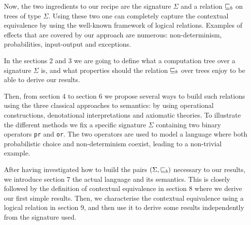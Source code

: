 Now, the two ingredients to our recipe are 
the signature $\Sigma$ and a relation $\sqsubseteq_b$ 
on trees of type $\Sigma$. Using these two one
can completely capture the contextual equivalence 
by using the well-known framework of logical relations.
Examples of effects that are covered by our 
approach are numerous: non-determinism, probabilities, 
input-output and exceptions. 


In the sections 2 and 3 we are going to define what 
a computation tree over a signature $\Sigma$ is, 
and what properties should the relation $\sqsubseteq_b$ 
over trees enjoy to be able to derive our results.

Then, from section 4 to section 6 we propose several 
ways to build such relations using the three classical 
approaches to semantics: by using operational constructions,
denotational interpretations and axiomatic theories.
To illustrate the different methods we 
fix a specific signature $\Sigma$
containing two binary operators \texttt{pr} and \texttt{or}. The two
operators are used to model a language where both probabilistic choice 
and non-determinism coexist, leading to a non-trivial example. 

After having investigated how to build the pairs $(\Sigma, \sqsubseteq_b)$
necessary to our results, we introduce section 7 the actual 
language and its semantics. This is closely followed by 
the definition of contextual equivalence in section 8 where
we derive our first simple results. Then, we characterise 
the contextual equivalence using a logical relation in 
section 9, and then use it to derive some results 
independently from the signature used.
